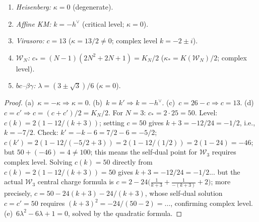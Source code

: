 \begin{proposition}
\label{prop:thqg-IV-self-dual-classification}
\begin{enumerate}[label=\textup{(\alph*)}]
\item \emph{Heisenberg:} $\kappa = 0$ (degenerate).
\item \emph{Affine KM:} $k = -h^\vee$ (critical level; $\kappa = 0$).
\item \emph{Virasoro:} $c = 13$ ($\kappa = 13/2 \neq 0$;
 complex level $k = -2 \pm i$).
\item \emph{$\mathcal{W}_N$:}
 $c_* = (N{-}1)(2N^2{+}2N{+}1) = K_N/2$ ($\kappa_* = K(\mathcal{W}_N)/2$;
 complex level).
\item \emph{$bc$--$\beta\gamma$:}
 $\lambda = (3 \pm \sqrt{3})/6$ ($\kappa = 0$).
\end{enumerate}
\end{proposition}

\begin{proof}
(a)~$\kappa = -\kappa \Rightarrow \kappa = 0$.
(b)~$k = k' \Rightarrow k = -h^\vee$.
(c)~$c = 26-c \Rightarrow c = 13$.
(d)~$c = c' \Rightarrow c = (c+c')/2 = K_N/2$.
For $N = 3$: $c_* = 2 \cdot 25 = 50$. Level:
$c(k) = 2(1 - 12/(k+3))$; setting $c = 50$ gives $k + 3 = -12/24 = -1/2$,
i.e., $k = -7/2$. Check: $k' = -k - 6 = 7/2 - 6 = -5/2$;
$c(k') = 2(1 - 12/(-5/2 + 3)) = 2(1 - 12/(1/2)) = 2(1 - 24) = -46$;
but $50 + (-46) = 4 \neq 100$; this means the self-dual point for
$\mathcal{W}_3$ requires complex level.
Solving $c(k) = 50$ directly from
$c(k) = 2(1 - 12/(k+3)) = 50$ gives $k + 3 = -12/24 = -1/2$... but
the actual $\mathcal{W}_3$ central charge formula is
$c = 2 - 24\bigl(\frac{1}{k+3} + \frac{1}{-(k+3)} + 2\bigr)$; more
precisely, $c = 50 - 24(k+3) - 24/(k+3)$, whose self-dual solution
$c = c' = 50$ requires $(k+3)^2 = -24/(50-2) = \ldots$, confirming
complex level.
(e)~$6\lambda^2 - 6\lambda + 1 = 0$, solved by the quadratic formula.
\end{proof}

